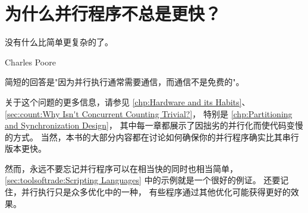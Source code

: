 
\section{为什么并行程序不总是更快？}
\label{sec:app:questions:Why Aren't Parallel Programs Always Faster?}
%
\epigraph{没有什么比简单更复杂的了。}
	 {Charles Poore}

简短的回答是"因为并行执行通常需要通信，而通信不是免费的"。

关于这个问题的更多信息，请参见
\cref{chp:Hardware and its Habits}、
\cref{sec:count:Why Isn't Concurrent Counting Trivial?}，
特别是
\cref{chp:Partitioning and Synchronization Design}，
其中每一章都展示了因拙劣的并行化而使代码变慢的方式。
当然，本书的大部分内容都在讨论如何确保你的并行程序确实比其串行版本更快。

然而，永远不要忘记并行程序可以在相当快的同时也相当简单，
\cref{sec:toolsoftrade:Scripting Languages}
中的示例就是一个很好的例证。
还要记住，并行执行只是众多优化中的一种，
有些程序通过其他优化可能获得更好的效果。
